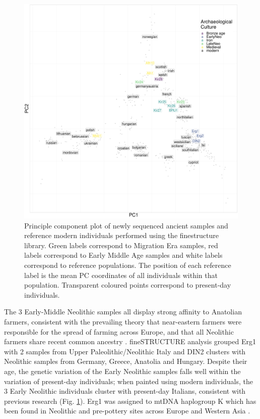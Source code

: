 \begin{figure}[htp]
    \centering
    \includegraphics[width=1.0\textwidth]{../images/chapter4/chunklengths_moderns_ancients_PCA.pdf}
    \caption{Principle component plot of newly sequenced ancient samples and reference modern individuals performed using the finestructure library. Green labels correspond to Migration Era samples, red labels correspond to Early Middle Age samples and white labels correspond to reference populations. The position of each reference label is the mean PC coordinates of all individuals within that population. Transparent coloured points correspond to present-day individuals.}
    \label{fig:chunklengths_moderns_ancients_PCA}
\end{figure}

The 3 Early-Middle Neolithic samples all display strong affinity to Anatolian farmers, consistent with the prevailing theory that near-eastern farmers were responsible for the spread of farming across Europe, and that all Neolithic farmers share recent common ancestry \cite{Haak2010, haak2005ancient, bramanti2009genetic, Lazaridis2014}. fineSTRUCTURE analysis grouped Erg1 with 2 samples from Upper Paleolithic/Neolithic Italy and DIN2 clusters with Neolithic samples from Germany, Greece, Anatolia and Hungary. Despite their age, the genetic variation of the Early Neolithic samples falls well within the variation of present-day individuals; when painted using modern individuals, the 3 Early Neolithic individuals cluster with present-day Italians, consistent with previous research \cite{Lazaridis2014, Haak2015} (Fig. \ref{fig:chunklengths_moderns_ancients_PCA}). Erg1 was assigned to mtDNA haplogroup K which has been found in Neolithic and pre-pottery sites across Europe \cite{Hofmanova2016, fernandez2014ancient} and Western Asia \cite{Lazaridis2016, Mathieson2015}. 

